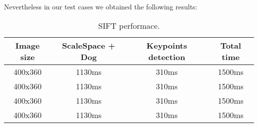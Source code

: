 Nevertheless in our test cases we obtained the following results:
\begin{table}[htb]
    \caption{\acs{SIFT} performace.}
    \label{tab:auto-data}
    \centering
    \begin{tabular}{c|c|c|c}
        \textbf{Image size} & \textbf{ScaleSpace + Dog} & \textbf{Keypoints
        detection} & \textbf{Total time}\\
        \hline
        400x360 & 1130ms & 310ms & 1500ms\\
        \hline
        400x360 & 1130ms & 310ms & 1500ms\\
        \hline
        400x360 & 1130ms & 310ms & 1500ms\\
        \hline
        400x360 & 1130ms & 310ms & 1500ms\\
        \hline
    \end{tabular}
\end{table}
